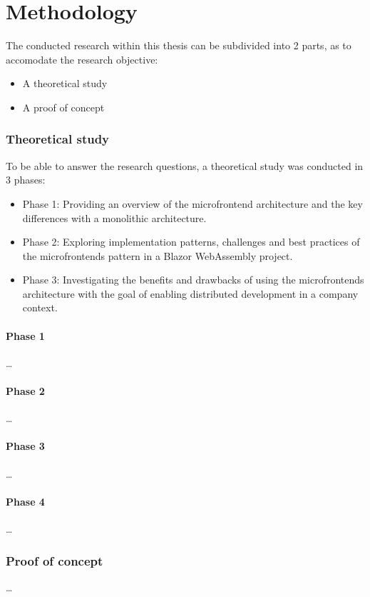 
\chapter{Methodology}
\label{ch:methodology}


The conducted research within this thesis can be subdivided into 2 parts, as to
accomodate the research objective:

\begin{itemize}
  \item A theoretical study
  \item A proof of concept
\end{itemize}

\subsection{Theoretical study}
To be able to answer the research questions, a theoretical study was conducted
in 3 phases:
\begin{itemize}
    \item Phase 1: Providing an overview of the microfrontend architecture and
    the key differences with a monolithic architecture.
    \item Phase 2: Exploring implementation patterns, challenges and best
    practices of the microfrontends pattern in a Blazor WebAssembly project.
    \item Phase 3: Investigating the benefits and drawbacks of using the
    microfrontends architecture with the goal of enabling distributed
    development in a company context.
\end{itemize}

\subsubsection{Phase 1}
\dots

\subsubsection{Phase 2}
\dots

\subsubsection{Phase 3}
\dots

\subsubsection{Phase 4}
\dots


\subsection{Proof of concept}

\dots